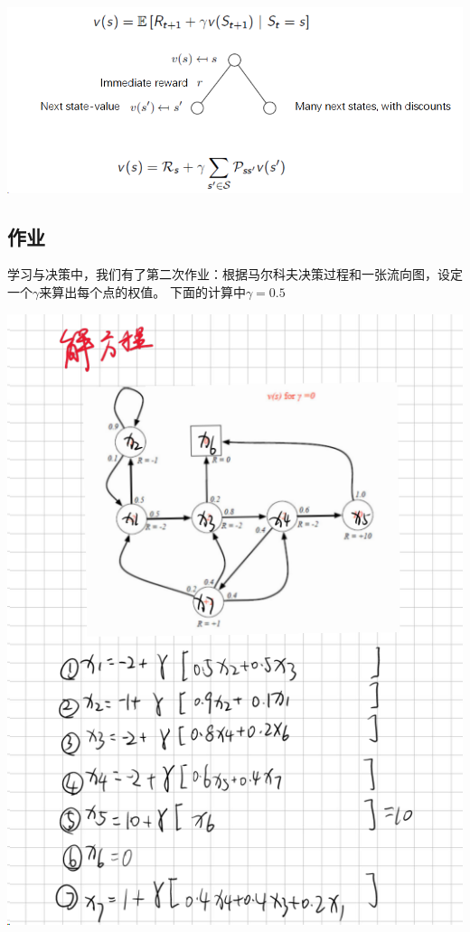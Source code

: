 \documentclass[letterpaper]{article} %
\begin{document}
\begin{center}
	\includegraphics[width=\linewidth]{screenshot003}
\end{center}


\subsection{作业}
学习与决策中，我们有了第二次作业：根据马尔科夫决策过程和一张流向图，设定一个$\gamma$来算出每个点的权值。
下面的计算中$\gamma = 0.5$ 
\begin{center}
	\includegraphics[width=0.9\linewidth]{screenshot001}
\end{center}
\end{document}
